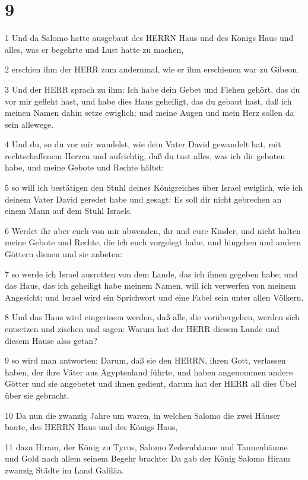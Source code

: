 \chapter{9}

\par 1 Und da Salomo hatte ausgebaut des HERRN Haus und des Königs Haus und alles, was er begehrte und Lust hatte zu machen,
\par 2 erschien ihm der HERR zum andernmal, wie er ihm erschienen war zu Gibeon.
\par 3 Und der HERR sprach zu ihm: Ich habe dein Gebet und Flehen gehört, das du vor mir gefleht hast, und habe dies Haus geheiligt, das du gebaut hast, daß ich meinen Namen dahin setze ewiglich; und meine Augen und mein Herz sollen da sein allewege.
\par 4 Und du, so du vor mir wandelst, wie dein Vater David gewandelt hat, mit rechtschaffenem Herzen und aufrichtig, daß du tust alles, was ich dir geboten habe, und meine Gebote und Rechte hältst:
\par 5 so will ich bestätigen den Stuhl deines Königreiches über Israel ewiglich, wie ich deinem Vater David geredet habe und gesagt: Es soll dir nicht gebrechen an einem Mann auf dem Stuhl Israels.
\par 6 Werdet ihr aber euch von mir abwenden, ihr und eure Kinder, und nicht halten meine Gebote und Rechte, die ich euch vorgelegt habe, und hingehen und andern Göttern dienen und sie anbeten:
\par 7 so werde ich Israel ausrotten von dem Lande, das ich ihnen gegeben habe; und das Haus, das ich geheiligt habe meinem Namen, will ich verwerfen von meinem Angesicht; und Israel wird ein Sprichwort und eine Fabel sein unter allen Völkern.
\par 8 Und das Haus wird eingerissen werden, daß alle, die vorübergehen, werden sich entsetzen und zischen und sagen: Warum hat der HERR diesem Lande und diesem Hause also getan?
\par 9 so wird man antworten: Darum, daß sie den HERRN, ihren Gott, verlassen haben, der ihre Väter aus Ägyptenland führte, und haben angenommen andere Götter und sie angebetet und ihnen gedient, darum hat der HERR all dies Übel über sie gebracht.
\par 10 Da nun die zwanzig Jahre um waren, in welchen Salomo die zwei Häuser baute, des HERRN Haus und des Königs Haus,
\par 11 dazu Hiram, der König zu Tyrus, Salomo Zedernbäume und Tannenbäume und Gold nach allem seinem Begehr brachte: Da gab der König Salomo Hiram zwanzig Städte im Land Galiläa.
